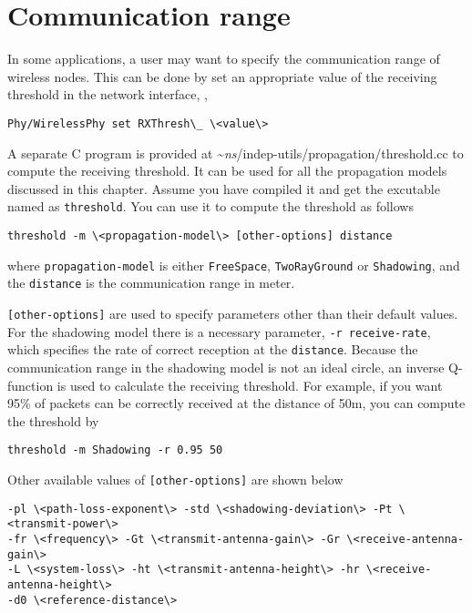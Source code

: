 \section{Communication range}
\label{sec:commrange}

In some applications, a user may want to specify the communication range of
wireless nodes. This can be done by set an appropriate value of the receiving
threshold in the network interface, \ie,

\begin{verbatim}
Phy/WirelessPhy set RXThresh\_ \<value\>
\end{verbatim}

A separate C program is provided at \textasciitilde\emph{ns}/{indep-utils/propagation/threshold.cc}
to compute the receiving threshold. It can be used for all the
propagation models discussed in this chapter. Assume you have compiled it and get
the excutable named as {\tt threshold}. You can use it to compute the threshold
as follows

\begin{verbatim}
threshold -m \<propagation-model\> [other-options] distance
\end{verbatim}

where {\tt \<propagation-model\>} is either {\tt FreeSpace}, {\tt TwoRayGround}
or {\tt Shadowing}, and the {\tt distance} is the communication range in meter.

{\tt [other-options]} are used to specify parameters other than their
default values. For the shadowing model there is a necessary parameter,
{\tt -r \<receive-rate\>}, which specifies the rate of correct reception at the
{\tt distance}. Because the communication range in the shadowing model is not
an ideal circle, an inverse Q-function \cite{Rappaport96} is used to calculate the
receiving threshold. For example, if you want 95\% of packets can be correctly
received at the distance of 50m, you can compute the threshold by

\begin{verbatim}
threshold -m Shadowing -r 0.95 50
\end{verbatim}

Other available values of {\tt [other-options]} are shown below

\begin{verbatim}
-pl \<path-loss-exponent\> -std \<shadowing-deviation\> -Pt \<transmit-power\>
-fr \<frequency\> -Gt \<transmit-antenna-gain\> -Gr \<receive-antenna-gain\>
-L \<system-loss\> -ht \<transmit-antenna-height\> -hr \<receive-antenna-height\>
-d0 \<reference-distance\>
\end{verbatim}


